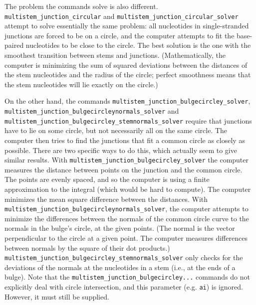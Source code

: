 \documentclass[letterpaper,12pt]{report}
\begin{document}
The problem the commands solve is also different.
{\tt multistem\_junction\_circular} and {\tt multistem\_junction\_circular\_solver}
 attempt to solve essentially the same problem: all nucleotides in
single-stranded junctions are
forced to be on a circle, and the computer attempts to fit the base-paired
nucleotides to
be close to the circle.  The best solution is the one with the
smoothest transition between stems and junctions.  (Mathematically, the
computer is minimizing the sum of squared deviations between the
distances of the stem nucleotides and the radius of the circle; perfect
smoothness means that the stem nucleotides will lie exactly on the circle.)

On the other hand, the commands {\tt multistem\_junction\_bulgecircley\_solver},
{\tt multistem\_junction\_bulgecircleynormals\_solver} and
{\tt multistem\_junction\_bulgecircley\_stemnormals\_solver} require that
junctions have to lie on some circle, but not necessarily all on the
same circle.  The computer then tries to find the junctions that fit a
common circle as closely as possible.  There are two specific ways to
do this, which actually seem to give similar results. With
{\tt multistem\_junction\_bulgecircley\_solver} the computer measures the
distance between points on the junction and the common circle.  The
points are evenly spaced, and so the computer is using a finite
approximation to the integral (which would be hard to compute). The
computer minimizes the mean square difference between the distances.
With {\tt multistem\_junction\_bulgecircleynormals\_solver}, the computer
attempts to minimize the differences between the normals of the common
circle curve to the normals in the bulge{\textquoteright}s circle, at
the given points.  (The normal is the vector perpendicular to the
circle at a given point.  The computer measures differences between
normals by the square of their dot products.)
{\tt multistem\_junction\_bulgecircley\_stemnormals\_solver} only checks for
the deviations of the normals at the nucleotides in a stem (i.e., at
the ends of a bulge).
Note that the {\tt multistem\_junction\_bulgecircley...} commands do not 
explicitly deal with circle intersection, and this parameter (e.g. {\tt ai}) is ignored.
However, it must still be supplied.
\end{document}
